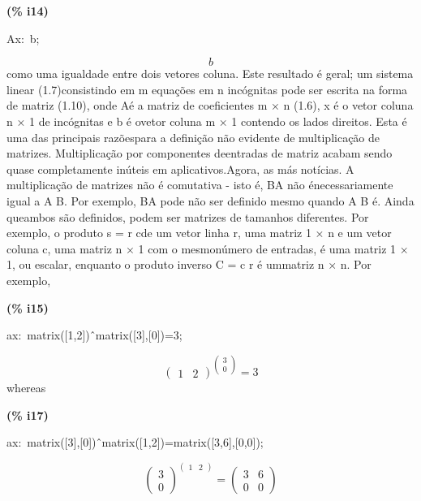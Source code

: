 \documentclass[fleqn]{article}
\begin{document}
\noindent
\begin{minipage}[t]{4.000000em}\color{red}\bfseries
(\% i14)	
\end{minipage}
\begin{minipage}[t]{\textwidth}\color{blue}
Ax:\ b;
\end{minipage}
\[\displaystyle \tag{Ax} 
b\mbox{}
\]
como uma igualdade entre dois vetores coluna. Este resultado é geral; um sistema linear (1.7)consistindo em m equações em n incógnitas pode ser escrita na forma de matriz (1.10), onde Aé a matriz de coeficientes m × n (1.6), x é o vetor coluna n × 1 de incógnitas e b é ovetor coluna m × 1 contendo os lados direitos. Esta é uma das principais razõespara a definição não evidente de multiplicação de matrizes. Multiplicação por componentes deentradas de matriz acabam sendo quase completamente inúteis em aplicativos.Agora, as más notícias. A multiplicação de matrizes não é comutativa - isto é, BA não énecessariamente igual a A B. Por exemplo, BA pode não ser definido mesmo quando A B é. Ainda queambos são definidos, podem ser matrizes de tamanhos diferentes. Por exemplo, o produto s = r cde um vetor linha r, uma matriz 1 × n e um vetor coluna c, uma matriz n × 1 com o mesmonúmero de entradas, é uma matriz 1 × 1, ou escalar, enquanto o produto inverso C = c r é ummatriz n × n. Por exemplo,


\noindent
\begin{minipage}[t]{4.000000em}\color{red}\bfseries
(\% i15)	
\end{minipage}
\begin{minipage}[t]{\textwidth}\color{blue}
ax:\ matrix([1,2])\^\ matrix([3],[0])=3;
\end{minipage}
\[\displaystyle \tag{ax} 
{{\begin{pmatrix}1 & 2\end{pmatrix}}^{\begin{pmatrix}3\\
0\end{pmatrix}}}\mathop{=}3\mbox{}
\]
whereas


\noindent
\begin{minipage}[t]{4.000000em}\color{red}\bfseries
(\% i17)	
\end{minipage}
\begin{minipage}[t]{\textwidth}\color{blue}
ax:\ matrix([3],[0])\^\ matrix([1,2])=matrix([3,6],[0,0]);
\end{minipage}
\[\displaystyle \tag{ax} 
{{\begin{pmatrix}3\\
0\end{pmatrix}}^{\begin{pmatrix}1 & 2\end{pmatrix}}}\mathop{=}\begin{pmatrix}3 & 6\\
0 & 0\end{pmatrix}\mbox{}
\]
\end{document}
